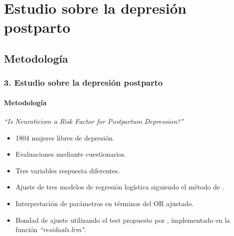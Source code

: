 \documentclass{beamer}
\begin{document}
\section{Estudio sobre la depresión postparto}
\subsection{Metodología}
\begin{frame}
\frametitle{3. Estudio sobre la depresión postparto}
\framesubtitle{Metodología}
	\vspace{-0.15cm}
	\footnotesize{\color{green!55!blue} \textit{``Is Neuroticism a Risk Factor for Postpartum Depression?"}\autocite{Estudioppal} }
	\normalsize
 	\begin{itemize}\itemsep8pt
 		\item 1804 mujeres libres de depresión.
 		\item Evaluaciones mediante cuestionarios.
 		\item Tres variables respuesta diferentes.  
 		\item Ajuste de tres modelos de regresión logística siguiendo el método de \textcite{hosmer}.
 		\item  Interpretación de parámetros en términos del OR ajustado.
 		\item Bondad de ajuste utilizando el test propuesto por \textcite{bondad}, implementado en la función \textit{``residuals.lrm"}.
 	\end{itemize}
\end{frame}
\end{document}
